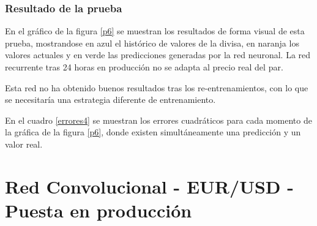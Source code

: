 \subsubsection*{Resultado de la prueba}

En el gráfico de la figura \ref{p6} se muestran los resultados de forma visual de esta prueba, mostrandose en azul el histórico de valores de la divisa, en naranja los valores actuales y en verde las predicciones generadas por la red neuronal. La red recurrente tras 24 horas en producción no se adapta al precio real del par. 

Esta red no ha obtenido buenos resultados tras los re-entrenamientos, con lo que se necesitaría una estrategia diferente de entrenamiento.

En el cuadro  \ref{errores4} se muestran los errores cuadráticos para cada momento de la gráfica de la figura \ref{p6}, donde existen simultáneamente una predicción y un valor real.


\clearpage





\section{Red Convolucional - EUR/USD - Puesta en producción}\label{sec:pruebarecbaja_4}


